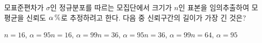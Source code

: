 모표준편차가 $\sigma$인 정규분포를 따르는 모집단에서 크기가 $n$인 표본을 임의추출하여 모평균을 신뢰도 $\alpha\mkern3mu \%$로 추정하려고 한다. 다음 중 신뢰구간의 길이가 가장 긴 것은? 
\begin{choicesii}{$n=16$, $\alpha=95$}{$n=16$, $\alpha=99$}{$n=36$, $\alpha=95$}{$n=36$, $\alpha=99$}{$n=64$, $\alpha=95$}\end{choicesii}

